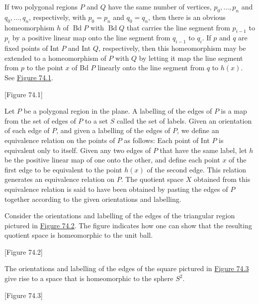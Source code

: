 If two polygonal regions \(P\) and \(Q\) have the same number of vertices, \(p_{0},\ldots ,p_{n}\) and \(q_{0},\ldots ,q_{n}\), respectively, with \(p_{0} = p_{n}\) and \(q_{0} = q_{n}\), then there is an obvious homeomorphism \(h\) of \(\operatorname{Bd}P\) with \(\operatorname{Bd}Q\) that carries the line segment from \(p_{i - 1}\) to \(p_{i}\) by a positive linear map onto the line segment from \(q_{i - 1}\) to \(q_{i}\). If \(p\) and \(q\) are fixed points of Int \(P\) and Int \(Q\), respectively, then this homeomorphism may be extended to a homeomorphism of \(P\) with \(Q\) by letting it map the line segment from \(p\) to the point \(x\) of Bd \(P\) linearly onto the line segment from \(q\) to \(h(x)\). See \hyperref[fig:74.1]{Figure 74.1}.

[Figure 74.1]
\begin{definition}
	Let \(P\) be a polygonal region in the plane. A labelling of the edges of \(P\) is a map from the set of edges of \(P\) to a set \(S\) called the set of labels. Given an orientation of each edge of \(P\), and given a labelling of the edges of \(P\), we define an equivalence relation on the points of \(P\) as follows: Each point of Int \(P\) is equivalent only to itself. Given any two edges of \(P\) that have the same label, let \(h\) be the positive linear map of one onto the other, and define each point \(x\) of the first edge to be equivalent to the point \(h(x)\) of the second edge. This relation generates an equivalence relation on \(P\). The quotient space \(X\) obtained from this equivalence relation is said to have been obtained by pasting the edges of \(P\) together according to the given orientations and labelling.
\end{definition}

\begin{centeredblock}
\begin{example}
\label{ex:\thesection.\theexample}
	Consider the orientations and labelling of the edges of the triangular region pictured in \hyperref[fig:74.2]{Figure 74.2}. The figure indicates how one can show that the resulting quotient space is homeomorphic to the unit ball.

[Figure 74.2]
\end{example}
\end{centeredblock}

\begin{centeredblock}
\begin{example}
\label{ex:\thesection.\theexample}
	The orientations and labelling of the edges of the square pictured in \hyperref[fig:74.3]{Figure 74.3} give rise to a space that is homeomorphic to the sphere \(S^{2}\).

[Figure 74.3]
\end{example}
\end{centeredblock}

